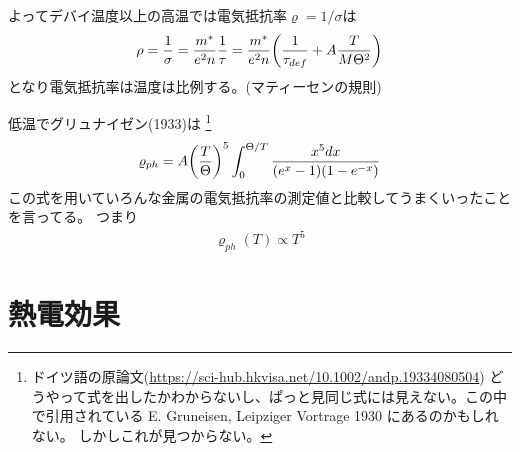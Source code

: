 \documentclass[11pt,dvipdfmx,a4paper]{jsarticle}
\begin{document}
よってデバイ温度以上の高温では電気抵抗率\(\varrho=1/\sigma\)は
\begin{align}
    \rho = \frac{1}{\sigma} = \frac{m^*}{e^2n} \frac{1}{\tau}
    = \frac{m^*}{e^2n} \qty(\frac{1}{\tau_{def}} + A\frac{T}{M\Theta^2})
\end{align}
となり電気抵抗率は温度は比例する。(マティーセンの規則)

低温でグリュナイゼン(1933)は
\footnote{ドイツ語の原論文(\url{https://sci-hub.hkvisa.net/10.1002/andp.19334080504})
どうやって式を出したかわからないし、ぱっと見同じ式には見えない。この中で引用されている E. Gruneisen, Leipziger Vortrage 1930 にあるのかもしれない。
しかしこれが見つからない。}
\begin{align}
    \varrho_{ph}=A\qty(\frac{T}{\Theta})^5\int_0^{\Theta/T} \frac{x^5dx}{(e^x-1)(1-e^{-x})} %
\end{align}
この式を用いていろんな金属の電気抵抗率の測定値と比較してうまくいったことを言ってる。
つまり
\begin{align}
    \varrho_{ph}(T) \propto T^5
\end{align}

\section{熱電効果}
\end{document}
